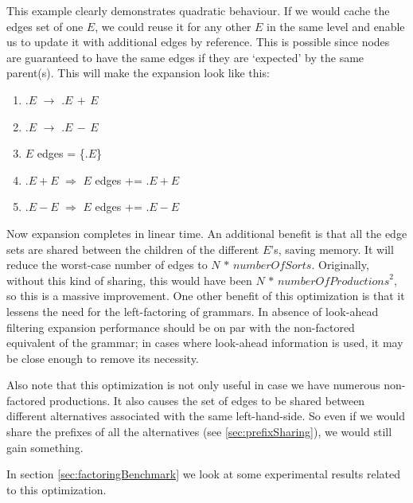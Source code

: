 \documentclass[a4paper,10pt]{article}
\begin{document}
This example clearly demonstrates quadratic behaviour. If we would cache the edges set of one $E$, we could reuse it for any other $E$ in the same level and enable us to update it with additional edges by reference. This is possible since nodes are guaranteed to have the same edges if they are `expected' by the same parent(s). This will make the expansion look like this:
\begin{enumerate}
 \setlength{\itemsep}{0pt}
 \setlength{\parskip}{0pt}
 \setlength{\parsep}{0pt}
 
 \item $.E$ $\rightarrow$ $.E\,+\,E$
 \item $.E$ $\rightarrow$ $.E\,-\,E$
 \item $E$ edges = \{$.E$\}
 \item $.E+E$ $\Rightarrow$ $E$ edges += $.E+E$
 \item $.E-E$ $\Rightarrow$ $E$ edges += $.E-E$
\end{enumerate}
Now expansion completes in linear time. An additional benefit is that all the edge sets are shared between the children of the different $E$'s, saving memory. It will reduce the worst-case number of edges to $N\,*\,\mathit{numberOfSorts}$. Originally, without this kind of sharing, this would have been $N\,*\,\mathit{numberOfProductions}^2$, so this is a massive improvement. One other benefit of this optimization is that it lessens the need for the left-factoring of grammars. In absence of look-ahead filtering expansion performance should be on par with the non-factored equivalent of the grammar; in cases where look-ahead information is used, it may be close enough to remove its necessity.

Also note that this optimization is not only useful in case we have numerous non-factored productions. It also causes the set of edges to be shared between different alternatives associated with the same left-hand-side. So even if we would share the prefixes of all the alternatives (see \ref{sec:prefixSharing}), we would still gain something.

In section \ref{sec:factoringBenchmark} we look at some experimental results related to this optimization.
\end{document}

